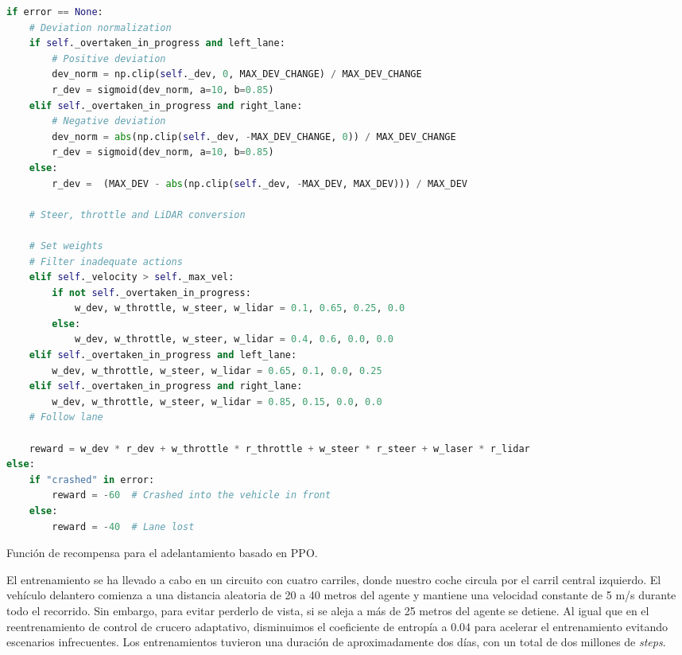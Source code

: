 \begin{code}[H]
\begin{lstlisting}[language=Python]
if error == None:
    # Deviation normalization
    if self._overtaken_in_progress and left_lane:
        # Positive deviation
        dev_norm = np.clip(self._dev, 0, MAX_DEV_CHANGE) / MAX_DEV_CHANGE
        r_dev = sigmoid(dev_norm, a=10, b=0.85)
    elif self._overtaken_in_progress and right_lane:
        # Negative deviation 
        dev_norm = abs(np.clip(self._dev, -MAX_DEV_CHANGE, 0)) / MAX_DEV_CHANGE
        r_dev = sigmoid(dev_norm, a=10, b=0.85)
    else:
        r_dev =  (MAX_DEV - abs(np.clip(self._dev, -MAX_DEV, MAX_DEV))) / MAX_DEV

    # Steer, throttle and LiDAR conversion

    # Set weights
    # Filter inadequate actions
    elif self._velocity > self._max_vel:
        if not self._overtaken_in_progress:
            w_dev, w_throttle, w_steer, w_lidar = 0.1, 0.65, 0.25, 0.0
        else:
            w_dev, w_throttle, w_steer, w_lidar = 0.4, 0.6, 0.0, 0.0
    elif self._overtaken_in_progress and left_lane:
        w_dev, w_throttle, w_steer, w_lidar = 0.65, 0.1, 0.0, 0.25
    elif self._overtaken_in_progress and right_lane:
        w_dev, w_throttle, w_steer, w_lidar = 0.85, 0.15, 0.0, 0.0  
    # Follow lane

    reward = w_dev * r_dev + w_throttle * r_throttle + w_steer * r_steer + w_laser * r_lidar
else:
    if "crashed" in error:
        reward = -60  # Crashed into the vehicle in front
    else:
        reward = -40  # Lane lost
\end{lstlisting}
\caption[Función de recompensa para el adelantamiento basado en \ac{PPO}]{Función de recompensa para el adelantamiento basado en \ac{PPO}.}
\label{cod:rew_ppo_overtaken}
\end{code}

El entrenamiento se ha llevado a cabo en un circuito con cuatro carriles, donde nuestro coche circula por el carril central izquierdo. El vehículo delantero comienza a una distancia aleatoria de 20 a 40 metros del agente y mantiene una velocidad constante de 5 m/s durante todo el recorrido. Sin embargo, para evitar perderlo de vista, si se aleja a más de 25 metros del agente se detiene. Al igual que en el reentrenamiento de control de crucero adaptativo, disminuimos el coeficiente de entropía a 0.04 para acelerar el entrenamiento evitando escenarios infrecuentes. Los entrenamientos tuvieron una duración de aproximadamente dos días, con un total de dos millones de \textit{steps}.


